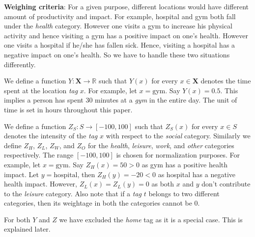 \documentclass[conference]{IEEEtran}
\begin{document}
\textbf{Weighing criteria}: For a given purpose, different locations would have different amount of productivity and impact. For example, hospital and gym both fall under the \textit{health} category. However one visits a gym to increase his physical activity and hence visiting a gym has a positive impact on one\rq s health. However one visits a hospital if he/she has fallen sick. Hence, visiting a hospital has a negative impact on one\rq s health. So we have to handle these two situations differently.

We define a function $Y:\mathbf{X} \rightarrow \mathbb{R}$ such that $Y(x)$ for every $x \in \mathbf{X}$ denotes the time spent at the location \textit{tag} $x$. For example, let $x = \text{gym}$. Say $Y(x) = 0.5$. This implies a person has spent $30$ minutes at a \textit{gym} in the entire day. The unit of time is set in hours throughout this paper.

We define a function $Z_S:S \rightarrow [-100, 100]$ such that $Z_S(x)$ for every $x \in S$ denotes the intensity of the \textit{tag} $x$ with respect to the \textit{social} category. Similarly we define $Z_H$, $Z_L$, $Z_W$, and $Z_O$ for the \textit{health}, \textit{leisure}, \textit{work}, and \textit{other} categories respectively. The range $[-100, 100]$ is chosen for normalization purposes. For example, let $x = \text{gym}$. Say $Z_H(x) = 50 > 0$ as gym has a positive health impact. Let $y = \text{hospital}$, then $Z_H(y) = -20 < 0$ as hospital has a negative health impact. However, $Z_L(x) = Z_L(y) = 0$ as both $x$ and $y$ don\rq t contribute to the \textit{leisure} category. Also note that if a \textit{tag} $t$ belongs to two different categories, then its weightage in both the categories cannot be $0$.

For both $Y$ and $Z$ we have excluded the \textit{home} tag as it is a special case. This is explained later.
\end{document}
